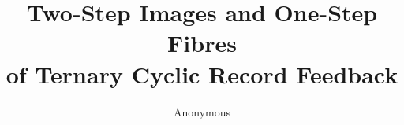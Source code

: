 \documentclass[a4paper,10pt]{amsart}
\title[Ternary cyclic record feedback]{Two-Step Images and One-Step Fibres\protect\\ of Ternary Cyclic Record Feedback}
\author{Anonymous}
\date{}
\begin{document}
\begin{abstract}

\end{abstract}
\maketitle






\end{document}
